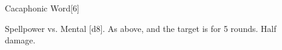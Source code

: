 
\begin{spellsection}{Cacaphonic Word}[6]
    \begin{spellheader}
    \end{spellheader}
    \begin{spellcontent}
        \begin{spelltargetinginfo}
        \end{spelltargetinginfo}
        \begin{spelleffects}
            \begin{spellattack}{Spellpower vs. Mental}
                \spellsuccess {}[d8].
                \spellcritical As above, and the target is \disoriented for 5 rounds.
                \spellfailure Half damage.
            \end{spellattack}
        \end{spelleffects}
    \end{spellcontent}
    \begin{spellfooter}
        \miscastexplode
    \end{spellfooter}
\end{spellsection}

